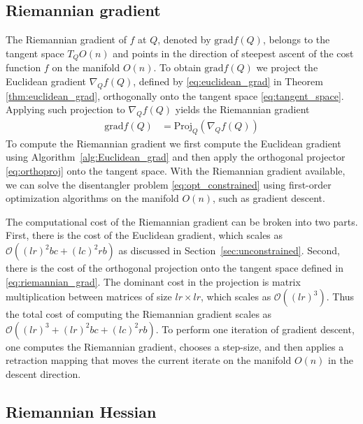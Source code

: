 \documentclass[pdflatex,sn-mathphys-num]{sn-jnl}
\newcounter{thm}[section]
\begin{document}
\subsection{Riemannian gradient} \label{sec:riemannian_grad}
The Riemannian gradient of $f$ at $Q$, denoted by $\textrm{grad} f(Q)$, belongs to the tangent space $T_Q O(n)$ and points in the direction of steepest ascent of the cost function $f$ on the manifold $O(n)$. To obtain $\textrm{grad}f(Q)$ we project the Euclidean gradient $\nabla_Q f(Q)$, defined by \eqref{eq:euclidean_grad} in Theorem \ref{thm:euclidean_grad}, orthogonally onto the tangent space \eqref{eq:tangent_space}. 
Applying such projection to $\nabla_Q f(Q)$ yields the Riemannian gradient 
\begin{equation} \label{eq:riemannian_grad} 
\begin{aligned}
\textrm{grad} f(Q) &= \textrm{Proj}_Q(\nabla_Q f(Q)) 
\end{aligned}
\end{equation}
To compute the Riemannian gradient we first compute the Euclidean gradient using Algorithm~\ref{alg:Euclidean_grad} and then apply the orthogonal projector \eqref{eq:orthoproj} onto the tangent space. With the Riemannian gradient available, we can solve the disentangler problem \eqref{eq:opt_constrained} using first-order optimization algorithms on the manifold $O(n)$, such as gradient descent. 

The computational cost of the Riemannian gradient can be broken into two parts. First, there is the cost of the Euclidean gradient, which scales as 
$\mathcal{O}((lr)^2bc + (lc)^2 rb)$ as discussed in Section~\ref{sec:unconstrained}. Second, there is the cost of the orthogonal projection onto the tangent space defined in \eqref{eq:riemannian_grad}. The dominant cost in the projection is matrix multiplication between matrices of size $lr \times lr$, which scales as $\mathcal{O}((lr)^3)$. Thus the total cost of computing the Riemannian gradient scales as $\mathcal{O}((lr)^3 + (lr)^2bc + (lc)^2 rb)$. 
To perform one iteration of gradient descent, one computes the Riemannian gradient, chooses a step-size, and then applies a retraction mapping that moves the current iterate on the manifold $O(n)$ in the descent direction. 

\subsection{Riemannian Hessian} 
\end{document}
